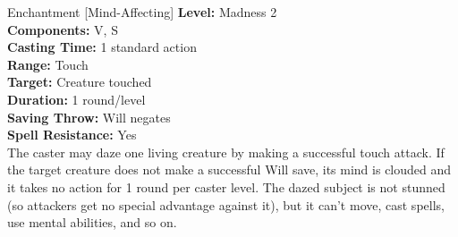 {Enchantment [Mind-Affecting]}
{
	\textbf{Level:} Madness 2\\
	\textbf{Components:} V, S\\
	\textbf{Casting Time:} 1 standard action\\
	\textbf{Range:} Touch\\
	\textbf{Target:} Creature touched\\
	\textbf{Duration:} 1 round/level\\
	\textbf{Saving Throw:} Will negates\\
	\textbf{Spell Resistance:} Yes\\
}
{
	The caster may daze one living creature by making a successful touch attack. If the target creature does not make a successful Will save, its mind is clouded and it takes no action for 1 round per caster level. The dazed subject is not stunned (so attackers get no special advantage against it), but it can't move, cast spells, use mental abilities, and so on.
}